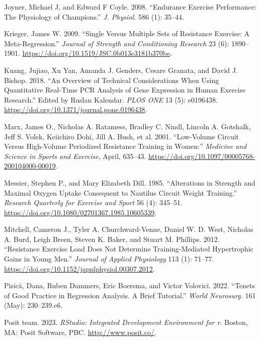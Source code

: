 \documentclass[
  letterpaper,
  DIV=11,
  numbers=noendperiod]{scrreprt}
\newlength{\cslhangindent}
\newenvironment{CSLReferences}[2] %
 {\begin{list}{}{%
  \setlength{\itemindent}{0pt}
  \setlength{\leftmargin}{0pt}
  \setlength{\parsep}{0pt}
  \ifodd #1
   \setlength{\leftmargin}{\cslhangindent}
   \setlength{\itemindent}{-1\cslhangindent}
  \fi
  \setlength{\itemsep}{#2\baselineskip}}}
 {\end{list}}
\begin{document}
\begin{CSLReferences}{1}{0}
Joyner, Michael J, and Edward F Coyle. 2008. {``Endurance Exercise
Performance: The Physiology of Champions.''} \emph{J. Physiol.} 586 (1):
35--44.

Krieger, James W. 2009. {``Single Versus Multiple Sets of Resistance
Exercise: A Meta-Regression.''} \emph{Journal of Strength and
Conditioning Research} 23 (6): 1890--1901.
\url{https://doi.org/10.1519/JSC.0b013e3181b370be}.

Kuang, Jujiao, Xu Yan, Amanda J. Genders, Cesare Granata, and David J.
Bishop. 2018. {``An Overview of Technical Considerations When Using
Quantitative Real-Time PCR Analysis of Gene Expression in Human Exercise
Research.''} Edited by Ruslan Kalendar. \emph{PLOS ONE} 13 (5):
e0196438. \url{https://doi.org/10.1371/journal.pone.0196438}.

Marx, James O., Nicholas A. Ratamess, Bradley C. Nindl, Lincoln A.
Gotshalk, Jeff S. Volek, Keiichiro Dohi, Jill A. Bush, et al. 2001.
{``Low-Volume Circuit Versus High-Volume Periodized Resistance Training
in Women:''} \emph{Medicine and Science in Sports and Exercise}, April,
635--43. \url{https://doi.org/10.1097/00005768-200104000-00019}.

Messier, Stephen P., and Mary Elizabeth Dill. 1985. {``Alterations in
Strength and Maximal Oxygen Uptake Consequent to Nautilus Circuit Weight
Training.''} \emph{Research Quarterly for Exercise and Sport} 56 (4):
345--51. \url{https://doi.org/10.1080/02701367.1985.10605339}.

Mitchell, Cameron J., Tyler A. Churchward-Venne, Daniel W. D. West,
Nicholas A. Burd, Leigh Breen, Steven K. Baker, and Stuart M. Phillips.
2012. {``Resistance Exercise Load Does Not Determine Training-Mediated
Hypertrophic Gains in Young Men.''} \emph{Journal of Applied Physiology}
113 (1): 71--77. \url{https://doi.org/10.1152/japplphysiol.00307.2012}.

Pisică, Dana, Ruben Dammers, Eric Boersma, and Victor Volovici. 2022.
{``Tenets of Good Practice in Regression Analysis. A Brief Tutorial.''}
\emph{World Neurosurg.} 161 (May): 230--239.e6.

Posit team. 2023. \emph{RStudio: Integrated Development Environment for
r}. Boston, MA: Posit Software, PBC. \url{http://www.posit.co/}.


\end{CSLReferences}
\end{document}
